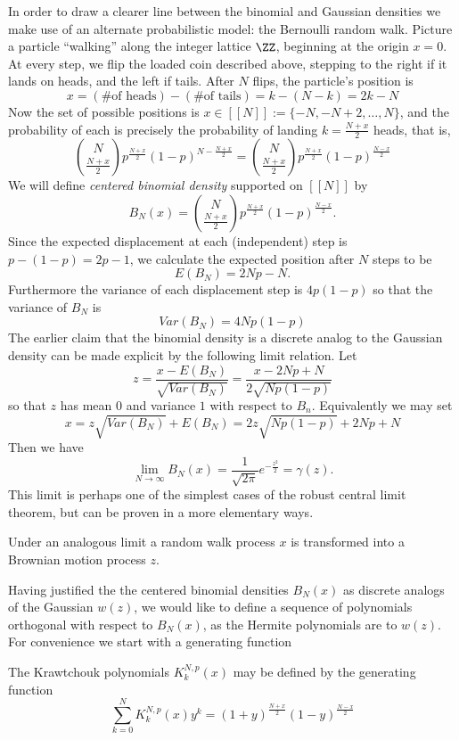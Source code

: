 In order to draw a clearer line between the binomial and Gaussian densities we make use of an alternate probabilistic model: the Bernoulli random walk. Picture a particle ``walking'' along the integer lattice $\ZZ$, beginning at the origin $x = 0$. At every step, we flip the loaded coin described above, stepping to the right if it lands on heads, and the left if tails. After $N$ flips, the particle's position is 
\[
  x = (\text{\# of heads}) - (\text{\# of tails}) = k - (N - k) = 2k - N
\]
Now the set of possible positions is $x \in [[N]] := \{-N, -N+2, \ldots, N\}$, and the probability of each is precisely the probability of landing $k = \frac{N + x}2$ heads, that is,
\[
  \binom{N}{\frac{N + x}2}p^{\frac{N + x}2}(1 - p)^{N - \frac{N + x}2}
  = \binom{N}{\frac{N + x}2}p^{\frac{N + x}2}(1 - p)^{\frac{N - x}2}
\]
We will define \emph{centered binomial density} supported on $[[N]]$ by
\[
  B_N(x) = \binom{N}{\frac{N+x}2}p^{\frac{N+x}2}(1-p)^{\frac{N-x}2}.
\]
Since the expected displacement at each (independent) step is $p - (1 - p) = 2p - 1$, we calculate the expected position after $N$ steps to be 
\[
  E(B_N) = 2Np-N.
\]
Furthermore the variance of each displacement step is $4p(1-p)$ so that the variance of $B_N$ is
\[
  Var(B_N) = 4Np(1-p)
\]
The earlier claim that the binomial density is a discrete analog to the Gaussian density can be made explicit by the following limit relation. Let \[
  z = \frac{x - E(B_N)}{\sqrt{Var(B_N)}} 
  = \frac{x - 2Np + N}{2\sqrt{Np(1-p)}}
\]
so that $z$ has mean $0$ and variance $1$ with respect to $B_n$. Equivalently we may set
\[
  x = z\sqrt{Var(B_N)} + E(B_N) = 2z\sqrt{Np(1-p)} + 2Np + N
\]
Then we have
\[
  \lim_{N \rightarrow \infty} B_N(x) = \frac{1}{\sqrt{2\pi}}e^{-\frac{z^2}2} = \gamma(z).
\]
This limit is perhaps one of the simplest cases of the robust central limit theorem, but can be proven in a  more elementary ways.

\begin{remark}
  Under an analogous limit a random walk process $x$ is transformed into a Brownian motion process $z$. 
\end{remark}

Having justified the the centered binomial densities $B_N(x)$ as discrete analogs of the Gaussian $w(z)$, we would like to define a sequence of polynomials orthogonal with respect to $B_N(x)$, as the Hermite polynomials are to $w(z)$. For convenience we start with a generating function 

\begin{definition}
  The Krawtchouk polynomials $K_k^{N,p}(x)$ may be defined by the generating function
  \[
    \sum_{k=0}^N K^{N,p}_k(x)y^k = (1 + y)^{\frac{N + x}2}(1 - y)^{\frac{N - x}2}
  \]
\end{definition}

